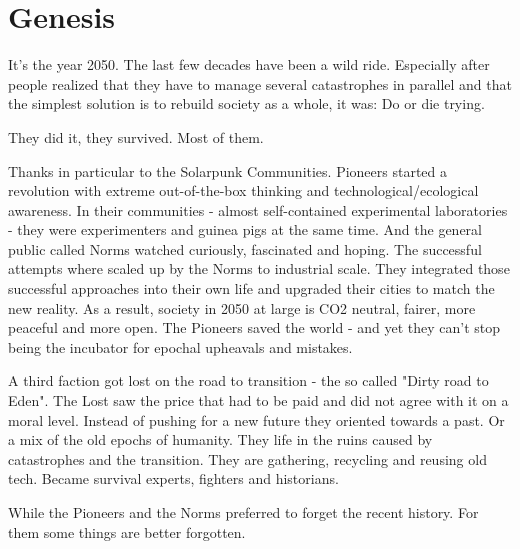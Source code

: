 \chapter{Genesis}

It's the year 2050. The last few decades have been a wild ride. Especially after people realized that they have to manage several catastrophes in parallel and that the simplest solution is to rebuild society as a whole, it was: Do or die trying.

They did it, they survived. Most of them.

Thanks in particular to the Solarpunk Communities. Pioneers started a revolution with extreme out-of-the-box thinking and technological/ecological awareness. In their communities - almost self-contained experimental laboratories - they were experimenters and guinea pigs at the same time. And the general public called Norms watched curiously, fascinated and hoping. The successful attempts where scaled up by the Norms to industrial scale. They integrated those successful approaches into their own life and upgraded their cities to match the new reality.
As a result, society in 2050 at large is CO2 neutral, fairer, more peaceful and more open.
The Pioneers saved the world - and yet they can't stop being the incubator for epochal upheavals and mistakes.

A third faction got lost on the road to transition - the so called "Dirty road to Eden". The Lost saw the price that had to be paid and did not agree with it on a moral level. Instead of pushing for a new future they oriented towards a past. Or a mix of the old epochs of humanity. They life in the ruins caused by catastrophes and the transition. They are gathering, recycling and reusing old tech. Became survival experts, fighters and historians.

While the Pioneers and the Norms preferred to forget the recent history. For them some things are better forgotten.